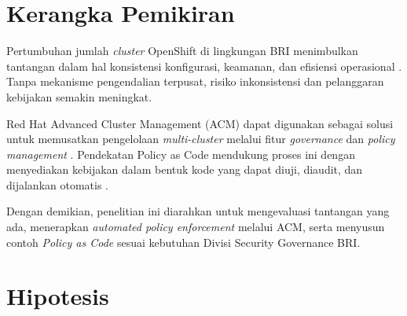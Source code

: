 \section{Kerangka Pemikiran}

Pertumbuhan jumlah \emph{cluster} OpenShift di lingkungan BRI menimbulkan tantangan dalam hal konsistensi konfigurasi, keamanan, dan efisiensi operasional \cite{burns2021kubernetes}. Tanpa mekanisme pengendalian terpusat, risiko inkonsistensi dan pelanggaran kebijakan semakin meningkat.

Red Hat Advanced Cluster Management (ACM) dapat digunakan sebagai solusi untuk memusatkan pengelolaan \emph{multi-cluster} melalui fitur \emph{governance} dan \emph{policy management} \cite{redhat2023acm}. Pendekatan Policy as Code mendukung proses ini dengan menyediakan kebijakan dalam bentuk kode yang dapat diuji, diaudit, dan dijalankan otomatis \cite{torstensson2021policyascode}.

Dengan demikian, penelitian ini diarahkan untuk mengevaluasi tantangan yang ada, menerapkan \emph{automated policy enforcement} melalui ACM, serta menyusun contoh \emph{Policy as Code} sesuai kebutuhan Divisi Security Governance BRI.


\section{Hipotesis}